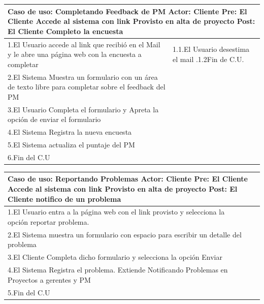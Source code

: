 \begin{longtable}{|p{}|p{}|}
    \hline
    \multicolumn{2}{|p{16cm}|}{
        \textbf{Caso de uso:} Completando Feedback de PM\newline
        \textbf{Actor:} Cliente\newline
        \textbf{Pre: }El Cliente Accede al sistema con link Provisto en alta de proyecto\newline
        \textbf{Post: }El Cliente Completo la encuesta
    }\\
    \hline
    1.El Usuario accede al link que recibió en el Mail y le abre una página web con la encuesta a completar & 1.1.El Usuario desestima el mail .\newline 1.2Fin de C.U.\\
    \hline
    2.El Sistema Muestra un formulario con un área de texto libre para completar sobre el feedback del PM &\\
    \hline
    3.El Usuario Completa el formulario y Apreta la opción de enviar el formulario& \\
    \hline
    4.El Sistema Registra la nueva encuesta&\\
    \hline
    5.El Sistema actualiza el puntaje del PM&\\
    \hline
    6.Fin del C.U&\\
    \hline
\end{longtable}

\begin{longtable}{|p{}|p{}|}
    \hline
    \multicolumn{2}{|p{16cm}|}{
        \textbf{Caso de uso:} Reportando Problemas\newline
        \textbf{Actor:} Cliente\newline
        \textbf{Pre: }El Cliente Accede al sistema con link Provisto en alta de proyecto\newline
        \textbf{Post: }El Cliente notifico de un problema
    }\\
    \hline
    1.El Usuario entra a la página web con el link provisto y selecciona la opción reportar problema.&\\
    \hline
    2.El Sistema muestra un formulario con espacio para escribir un detalle del problema&    \\
    \hline
    3.El Cliente Completa dicho formulario y selecciona la opción Enviar& \\
    \hline
    4.El Sistema Registra el problema. Extiende Notificando Problemas en Proyectos a gerentes y PM&\\
    \hline
    5.Fin del C.U&\\
    \hline
\end{longtable}

